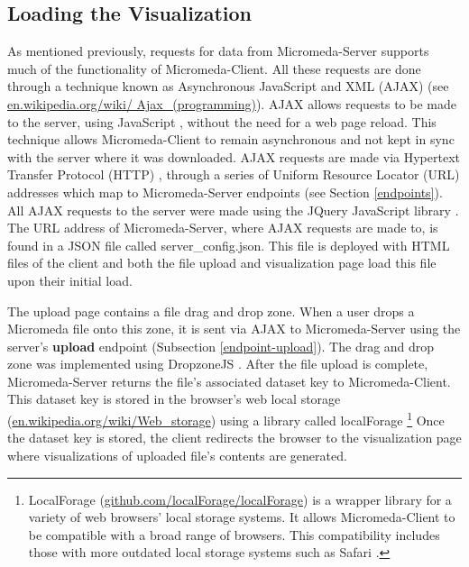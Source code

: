 \subsection{Loading the Visualization}

As mentioned previously, requests for data from Micromeda-Server supports much of the functionality of Micromeda-Client. All these requests are done through a technique known as Asynchronous JavaScript and XML (AJAX) \cite{garrett2005ajax,li2012jquery} (see \href{en.wikipedia.org/wiki/Ajax\_(programming)}{en.wikipedia.org/wiki/ Ajax\_(programming)}). AJAX allows requests to be made to the server, using JavaScript \cite{flanagan2006javascript}, without the need for a web page reload. This technique allows Micromeda-Client to remain asynchronous and not kept in sync with the server where it was downloaded. AJAX requests are made via Hypertext Transfer Protocol (HTTP) \cite{fielding1999hypertext}, through a series of Uniform Resource Locator (URL) addresses \cite{berners1994rfc} which map to Micromeda-Server endpoints (see Section \ref{endpoints}). All AJAX requests to the server were made using the JQuery JavaScript library \cite{chaffer2013learning,li2012jquery}. The URL address of Micromeda-Server, where AJAX requests are made to, is found in a JSON file called server\_config.json. This file is deployed with HTML files of the client and both the file upload and visualization page load this file upon their initial load.

The upload page contains a file drag and drop zone. When a user drops a Micromeda file onto this zone, it is sent via AJAX to Micromeda-Server using the server's \textbf{upload} endpoint (Subsection \ref{endpoint-upload}). The drag and drop zone was implemented using DropzoneJS \cite{meno}. After the file upload is complete, Micromeda-Server returns the file's associated dataset key to Micromeda-Client. This dataset key is stored in the browser's web local storage \cite{Hickson} (\href{en.wikipedia.org/wiki/Web\_storage}{en.wikipedia.org/wiki/Web\_storage}) using a library called localForage \cite{localforage} \footnote{LocalForage (\href{github.com/localForage/localForage}{github.com/localForage/localForage}) is a wrapper library for a variety of web browsers' local storage systems. It allows Micromeda-Client to be compatible with a broad range of browsers. This compatibility includes those with more outdated local storage systems such as Safari \cite{lawson_2014}.} Once the dataset key is stored, the client redirects the browser to the visualization page where visualizations of uploaded file's contents are generated.

